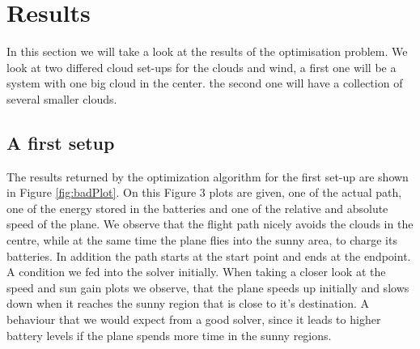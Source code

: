 \section{Results}

In this section we will take a look at the results of the optimisation problem.
We look at two differed cloud set-ups for the clouds and wind, a first one will be a system with one big cloud in the center. the second one will have a collection of several smaller clouds.


\subsection{A first setup}

The results returned by the optimization algorithm  for the first set-up are shown in Figure \ref{fig:badPlot}. 
On this Figure 3 plots are given, one of the actual path, one of the energy stored in the batteries and one of the relative and absolute speed of the plane.
We observe that the flight path nicely avoids the clouds in the centre, while at the same time the plane flies into the sunny area, to charge its batteries. In addition the path starts at the start point and ends at the endpoint. A condition we fed into the solver initially. 
 When taking a closer look at the speed and sun gain plots we observe, that the plane speeds up initially and slows down when it reaches the sunny region that is close to it's destination. A behaviour that we would expect from a good solver, since it leads to higher battery levels if the plane spends more time in the sunny regions.
